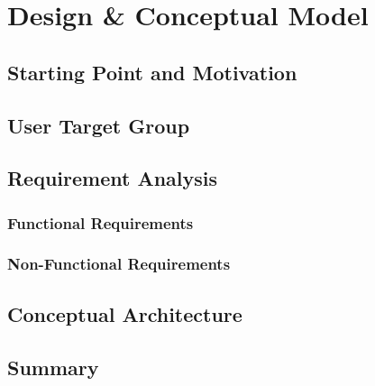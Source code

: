 
\chapter{Design \& Conceptual Model}

\section{Starting Point and Motivation}

\section{User Target Group}

\section{Requirement Analysis}
\subsection{Functional Requirements}
\subsection{Non-Functional Requirements}

\section{Conceptual Architecture}


\section{Summary}